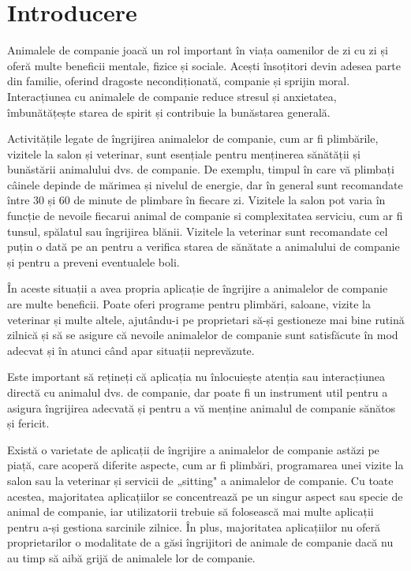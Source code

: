 \chapter*{Introducere} 

Animalele de companie joacă un rol important în viața oamenilor de zi cu zi și oferă multe beneficii mentale, fizice și sociale. Acești însoțitori devin adesea parte din familie, oferind dragoste necondiționată, companie și sprijin moral. Interacțiunea cu animalele de companie  reduce stresul și anxietatea, îmbunătățește starea de spirit și contribuie la bunăstarea generală.

Activitățile legate de îngrijirea animalelor de companie, cum ar fi plimbările, vizitele la salon și veterinar, sunt esențiale pentru menținerea sănătății și bunăstării animalului dvs. de companie. De exemplu, timpul în care vă plimbați câinele depinde de mărimea și nivelul de energie, dar în general sunt recomandate între 30 și 60 de minute de plimbare în fiecare zi. Vizitele la salon pot varia în funcție de nevoile  fiecarui animal de companie si complexitatea serviciu, cum ar fi tunsul, spălatul sau îngrijirea blănii. Vizitele la veterinar sunt recomandate cel puțin o dată pe an pentru a verifica starea de sănătate a animalului de companie și pentru a preveni eventualele boli.

În aceste situații a avea propria aplicație de îngrijire a animalelor de companie are multe beneficii. Poate oferi programe pentru plimbări, saloane, vizite la veterinar și multe altele, ajutându-i pe proprietari să-și gestioneze mai bine rutină zilnică și să se asigure că nevoile animalelor de companie sunt satisfăcute în mod adecvat și în atunci când apar situații neprevăzute.

Este important să rețineți că aplicația nu înlocuiește atenția sau interacțiunea directă cu animalul dvs. de companie, dar poate fi un instrument util  pentru a asigura îngrijirea adecvată și pentru a vă menține animalul de companie sănătos și fericit.

Există o varietate de aplicații de îngrijire a animalelor de companie astăzi pe piață, care acoperă diferite aspecte, cum ar fi plimbări, programarea unei vizite la salon sau la veterinar și servicii de „sitting" a animalelor de companie. Cu toate acestea, majoritatea aplicațiilor se concentrează pe un singur aspect sau specie de animal de companie, iar utilizatorii trebuie să folosească mai multe aplicații pentru a-și gestiona sarcinile zilnice. În plus, majoritatea aplicațiilor nu oferă proprietarilor o modalitate de a găsi îngrijitori de animale de companie dacă nu au timp să aibă grijă de animalele lor de companie. 

